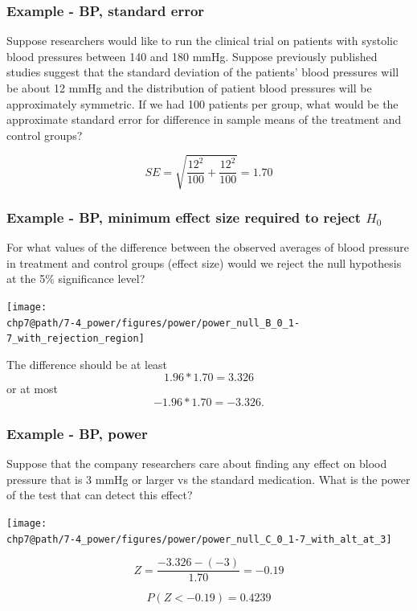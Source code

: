 \documentclass[slidestop,compress,mathserif]{beamer}
\makeatletter
\newcommand{\soln}[1]{\textit{#1}}
\def\chp7@path{../../Chp 7}
\makeatother
\begin{document}
\begin{frame}
\frametitle{Example - BP, standard error}

{\dq
{\footnotesize
Suppose researchers would like to run the clinical trial on patients with systolic blood pressures between 140 and 180 mmHg. Suppose previously published studies suggest that the standard deviation of the patients' blood pressures will be about 12 mmHg and the distribution of patient blood pressures will be approximately symmetric. If we had 100 patients per group, what would be the approximate standard error for difference in sample means of the treatment and control groups?
}
}

\pause

\soln{
\[ SE = \sqrt{ \frac{12^2}{100} + \frac{12^2}{100} } = 1.70 \]
}

\end{frame}


\begin{frame}
\frametitle{Example - BP, minimum effect size required to reject $H_0$}

{\dq
{\footnotesize
For what values of the difference between the observed averages of blood pressure in treatment and control groups (effect size) would we reject the null hypothesis at the 5\% significance level?}
}

\pause

\texttt{[image: \\chp7@path/7-4\_power/figures/power/power\_null\_B\_0\_1-7\_with\_rejection\_region]}

\pause

The difference should be at least 
\[ 1.96 * 1.70 = 3.326 \] 
or at most 
\[ -1.96 * 1.70 = -3.326. \]

\end{frame}


\begin{frame}
\frametitle{Example - BP, power}

{\dq
{\footnotesize
Suppose that the company researchers care about finding any effect on blood pressure that is 3 mmHg or larger vs the standard medication. What is the power of the test that can detect this effect?
}}

\pause

\texttt{[image: \\chp7@path/7-4\_power/figures/power/power\_null\_C\_0\_1-7\_with\_alt\_at\_3]}

\pause

\[ Z = \frac{-3.326 - (-3)}{1.70} = -0.19 \]

\pause

\[ P(Z < -0.19) = 0.4239 \]

\end{frame}
\end{document}
